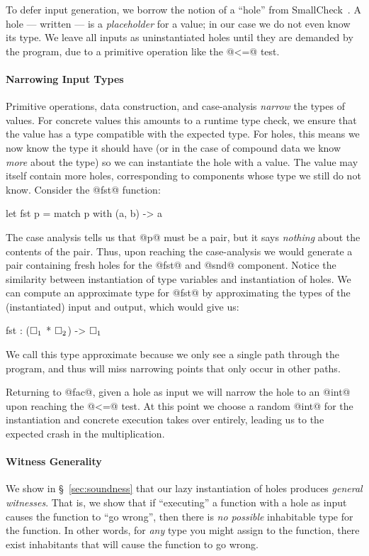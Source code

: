 To defer input generation, we borrow the notion of a ``hole'' from
SmallCheck~\cite{runciman_smallcheck_2008}.
%
A hole --- written \ehole{} --- is a \emph{placeholder} for a value; in
our case we do not even know its type.
%
We leave all inputs as uninstantiated holes until they are demanded by
the program, \eg due to a primitive operation like the @<=@ test.

\paragraph{Narrowing Input Types}
Primitive operations, data construction, and case-analysis \emph{narrow}
the types of values.
%
For concrete values this amounts to a runtime type check, we ensure that
the value has a type compatible with the expected type.
%
For holes, this means we now know the type it should
have (or in the case of compound data we know \emph{more} about the
type) so we can instantiate the hole with a value.
%
The value may itself contain more holes, corresponding to components
whose type we still do not know.
%
Consider the @fst@ function:
%
\begin{code}
  let fst p = match p with
    (a, b) -> a
\end{code}
%
The case analysis tells us that @p@ must be a pair, but it says
\emph{nothing} about the contents of the pair.
%
Thus, upon reaching the case-analysis we would generate a pair
containing fresh holes for the @fst@ and @snd@ component.
%
Notice the similarity between instantiation of type variables and
instantiation of holes.
%
We can compute an approximate type for @fst@ by approximating the types
of the (instantiated) input and output, which would give us:
%
\begin{mcode}
  fst : ($\square_{1}$ * $\square_{2}$) -> $\square_{1}$
\end{mcode}
%
We call this type approximate because we only see a single path through
the program, and thus will miss narrowing points that only occur in
other paths.

Returning to @fac@, given a hole as input we will narrow the hole
to an @int@ upon reaching the @<=@ test.
%
At this point we choose a random @int@ for the instantiation and
concrete execution takes over entirely, leading us to the expected crash
in the multiplication.

\paragraph{Witness Generality}
We show in \S~\ref{sec:soundness} that our lazy instantiation of holes
produces \emph{general witnesses}.
%
That is, we show that if ``executing''
a function with a hole as input causes the
function to ``go wrong'', then there is
\emph{no possible} inhabitable type for the function.
%
In other words, for \emph{any} type you might
assign to the function, there exist inhabitants
that will cause the function to go wrong.

